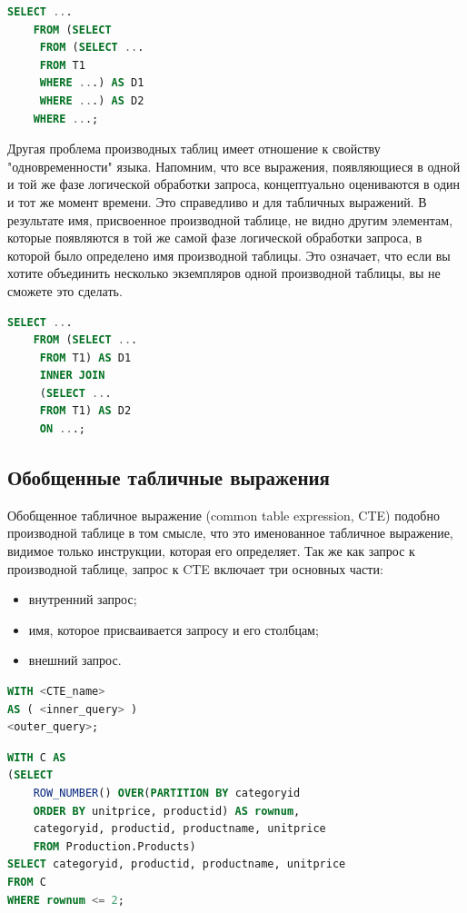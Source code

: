 \begin{lstlisting}[label=lst:funcReturn, language=sql]
	SELECT ...
	FROM (SELECT
	 FROM (SELECT ...
	 FROM T1
	 WHERE ...) AS D1
	 WHERE ...) AS D2
	WHERE ...;  
\end{lstlisting}

Другая проблема производных таблиц имеет отношение к свойству "одновременности" языка. Напомним, что все выражения, появляющиеся в одной и той же фазе
логической обработки запроса, концептуально оцениваются в один и тот же момент
времени. Это справедливо и для табличных выражений. В результате имя, присвоенное производной таблице, не видно другим элементам, которые появляются в той
же самой фазе логической обработки запроса, в которой было определено имя производной таблицы. Это означает, что если вы хотите объединить несколько экземпляров одной производной таблицы, вы не сможете это сделать.

\begin{lstlisting}[label=lst:funcReturn, language=sql]
	SELECT ...
	FROM (SELECT ...
	 FROM T1) AS D1
	 INNER JOIN
	 (SELECT ...
	 FROM T1) AS D2
	 ON ...; 
\end{lstlisting}


\subsection{Обобщенные табличные выражения}

Обобщенное табличное выражение (common table expression, CTE) подобно
производной таблице в том смысле, что это именованное табличное выражение, видимое только инструкции, которая его определяет. Так же как запрос
к производной таблице, запрос к CTE включает три основных части:

\begin{itemize}
	\item внутренний запрос; 
	\item имя, которое присваивается запросу и его столбцам;
	\item внешний запрос.
\end{itemize}

\begin{lstlisting}[label=lst:funcReturn, language=sql]
WITH <CTE_name>
AS ( <inner_query> )
<outer_query>; 
\end{lstlisting}

\begin{lstlisting}[label=lst:funcReturn, language=sql]
WITH C AS
(SELECT
	ROW_NUMBER() OVER(PARTITION BY categoryid
	ORDER BY unitprice, productid) AS rownum,
	categoryid, productid, productname, unitprice
	FROM Production.Products)
SELECT categoryid, productid, productname, unitprice
FROM C
WHERE rownum <= 2;
\end{lstlisting}


